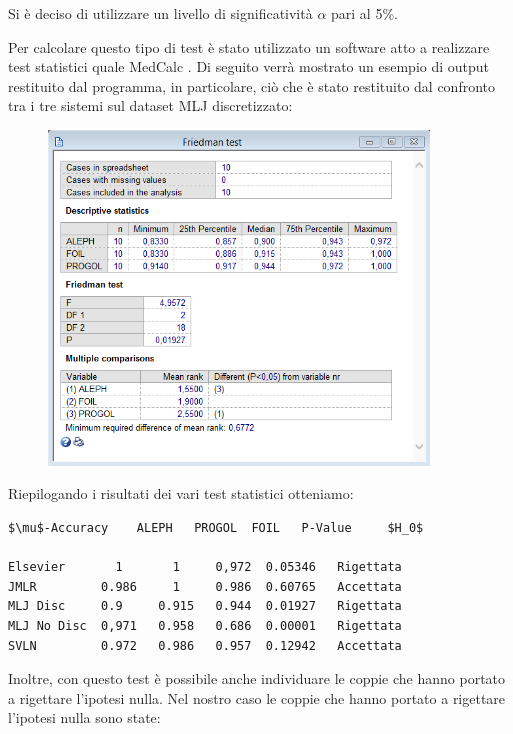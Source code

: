 Si è deciso di utilizzare un livello di significatività $\alpha$ pari al 5\%.

Per calcolare questo tipo di test è stato utilizzato un software atto a realizzare test statistici quale MedCalc \textcopyright.
Di seguito verrà mostrato un esempio di output restituito dal programma, in particolare, ciò che è stato restituito dal confronto tra i tre sistemi sul dataset MLJ discretizzato:
\begin{figure}[H]
	\includegraphics[width=0.9\textwidth]{img/TestResult/mljdiscr.png}
	\label{Friedman Test - MLJ Discretizzato}
\end{figure}

Riepilogando i risultati dei vari test statistici otteniamo:

\begin{lstlisting}
$\mu$-Accuracy    ALEPH   PROGOL  FOIL   P-Value     $H_0$
     
Elsevier       1       1     0,972  0.05346   Rigettata
JMLR         0.986     1     0.986  0.60765   Accettata
MLJ Disc     0.9     0.915   0.944  0.01927   Rigettata
MLJ No Disc  0,971   0.958   0.686  0.00001   Rigettata
SVLN         0.972   0.986   0.957  0.12942   Accettata
\end{lstlisting}


Inoltre, con questo test è possibile anche individuare le coppie che hanno portato a rigettare l'ipotesi nulla. Nel nostro caso le coppie che hanno portato a rigettare l'ipotesi nulla sono state:


